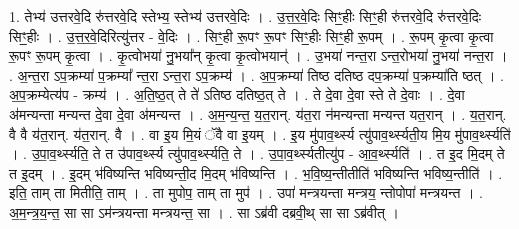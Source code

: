 \documentclass[17pt]{extarticle}
\begin{document}
1. तेभ्य॑ उत्तरवे॒दि रु॑त्तरवे॒दि स्तेभ्य॒ स्तेभ्य॑ उत्तरवे॒दिः । . उ॒त्त॒र॒वे॒दिः सिꣳ॒॒हीः सिꣳ॒॒ही रु॑त्तरवे॒दि रु॑त्तरवे॒दिः सिꣳ॒॒हीः । . उ॒त्त॒र॒वे॒दिरित्यु॑त्तर - वे॒दिः । . सिꣳ॒॒ही रू॒पꣳ रू॒पꣳ सिꣳ॒॒हीः सिꣳ॒॒ही रू॒पम् । . रू॒पम् कृ॒त्वा कृ॒त्वा रू॒पꣳ रू॒पम् कृ॒त्वा । . कृ॒त्वोभया॑ नु॒भया᳚न् कृ॒त्वा कृ॒त्वोभयान्॑ । . उ॒भया॑ नन्त॒रा ऽन्त॒रोभया॑ नु॒भया॑ नन्त॒रा । . अ॒न्त॒रा ऽप॒क्रम्या॑ प॒क्रम्या᳚ न्त॒रा ऽन्त॒रा ऽप॒क्रम्य॑ । . अ॒प॒क्रम्या॑ तिष्ठ दतिष्ठ दप॒क्रम्या॑ प॒क्रम्या॑ति ष्ठत् । . अ॒प॒क्रम्येत्य॑प - क्रम्य॑ । . अ॒ति॒ष्ठ॒त् ते ते॑ ऽतिष्ठ दतिष्ठ॒त् ते । . ते दे॒वा दे॒वा स्ते ते दे॒वाः । . दे॒वा अ॑मन्यन्ता मन्यन्त दे॒वा दे॒वा अ॑मन्यन्त । . अ॒म॒न्य॒न्त॒ य॒त॒रान्. य॑त॒रा न॑मन्यन्ता मन्यन्त यत॒रान् । . य॒त॒रान्. वै वै य॑त॒रान्. य॑त॒रान्. वै । . वा इ॒य मि॒यं ॅवै वा इ॒यम् । . इ॒य मु॑पाव॒र्थ्स्य त्यु॑पाव॒र्थ्स्यती॒य मि॒य मु॑पाव॒र्थ्स्यति॑ । . उ॒पा॒व॒र्थ्स्यति॒ ते त उ॑पाव॒र्थ्स्य त्यु॑पाव॒र्थ्स्यति॒ ते । . उ॒पा॒व॒र्थ्स्यतीत्यु॑प - आ॒व॒र्थ्स्यति॑ । . त इ॒द मि॒दम् ते त इ॒दम् । . इ॒दम् भ॑विष्यन्ति भविष्यन्ती॒द मि॒दम् भ॑विष्यन्ति । . भ॒वि॒ष्य॒न्तीतीति॑ भविष्यन्ति भविष्य॒न्तीति॑ । . इति॒ ताम् ता मितीति॒ ताम् । . ता मुपोप॒ ताम् ता मुप॑ । . उपा॑ मन्त्रयन्ता मन्त्रय॒ न्तोपोपा॑ मन्त्रयन्त । . अ॒म॒न्त्र॒य॒न्त॒ सा सा ऽम॑न्त्रयन्ता मन्त्रयन्त॒ सा । . सा ऽब्र॑वी दब्रवी॒थ् सा सा ऽब्र॑वीत् । \newline
\end{document}
